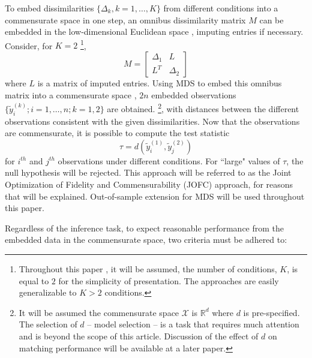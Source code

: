 \documentclass[11pt]{article} %
\begin{document}
To embed dissimilarities  $\{\Delta_k,k=1 ,\ldots,K\}$  from different conditions into a commensurate space in one step, an omnibus dissimilarity matrix  $M$ can be embedded in the low-dimensional Euclidean space , imputing entries if necessary. Consider, for $K=2$ \footnote{Throughout this paper , it will be assumed,  the number of conditions, $K$, is equal to $2$ for the  simplicity of presentation. The approaches are easily generalizable to $K>2$ conditions.},
 \begin{equation}
M=  \left[ \begin{array}{cc}
         \Delta_1 & L\\
        L^T  & \Delta_2 
     \end{array}  \right]     \label{omnibus} 
\end{equation} where $L$ is a matrix of imputed entries. Using MDS to embed  this omnibus matrix into a  commensurate space  ,  $2n$ embedded observations $\{\tilde{y}_i^{(k)}; i=1,\ldots,n;k=1,2\}$ are obtained. \footnote{ 
It  will be assumed  the commensurate space  $\mathcal{X}$  is  $\mathbb{R}^d$ where $d$ is pre-specified. The selection of $d$ -- model selection -- is  a task that requires much attention and is  beyond the scope of this article. Discussion of the effect of $d$ on matching performance will be available at a later paper.  }, with distances between the different observations consistent with the given dissimilarities. Now that the observations are commensurate, it is possible to  compute the test statistic \[
\tau=d\left(\tilde{y}_i^{(1)},\tilde{y}_j^{(2)}\right)\label{teststat}
\] for $i^{th}$ and $j^{th}$ observations under different conditions.  For ``large" values of $\tau$, the null hypothesis will be rejected. This approach will be referred to as the Joint Optimization of Fidelity and Commensurability (JOFC) approach, for reasons that will be explained. 
  Out-of-sample extension for MDS will be used throughout this paper\cite{TrossetOOS}. 


Regardless of the inference task,  to expect reasonable performance from the embedded data in the commensurate space, two criteria must be adhered to:
\end{document}
